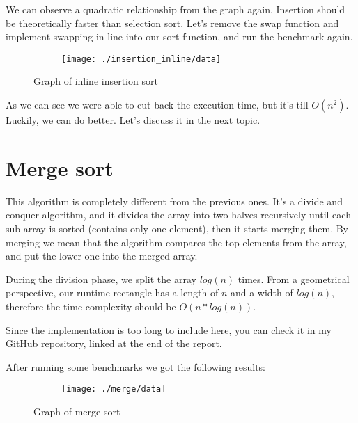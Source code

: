 \documentclass[a4paper,11pt]{article}
\begin{document}
    We can observe a quadratic relationship from the graph again.
    Insertion should be theoretically faster than selection sort.
    Let's remove the swap function and implement swapping in-line into our sort function, and run the benchmark again.

    \begin{figure}[h]
        \centering
        \begin{subfigure}[b]{.5\textwidth}
            \centering
            \texttt{[image: ./insertion\_inline/data]} %
        \end{subfigure}
        \caption{Graph of inline insertion sort}
        \label{fig:graph_3}
    \end{figure}

    As we can see we were able to cut back the execution time, but it's till $O(n^2)$.
    Luckily, we can do better.
    Let's discuss it in the next topic.

    \section*{Merge sort}

    This algorithm is completely different from the previous ones.
    It's a divide and conquer algorithm, and it divides the array into two halves recursively until each sub array is sorted (contains only one element), then it starts merging them.
    By merging we mean that the algorithm compares the top elements from the array, and put the lower one into the merged array.

    During the division phase, we split the array $log(n)$ times.
    From a geometrical perspective, our runtime rectangle has a length of $n$ and a width of $log(n)$, therefore the time complexity should be $O(n*log(n))$.

    Since the implementation is too long to include here, you can check it in my GitHub repository, linked at the end of the report.

    After running some benchmarks we got the following results:

    \begin{figure}[H]
        \centering
        \begin{subfigure}[b]{.5\textwidth}
            \centering
            \texttt{[image: ./merge/data]} %
        \end{subfigure}
        \caption{Graph of merge sort}
        \label{fig:graph_4}
    \end{figure}
\end{document}
